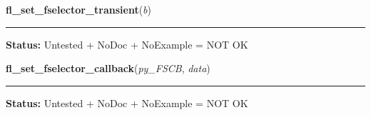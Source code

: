     \label{xformslib:library:fl_set_fselector_transient}

    \vspace{0.5ex}

\hspace{.8\funcindent}\begin{boxedminipage}{\funcwidth}

    \raggedright \textbf{fl\_set\_fselector\_transient}(\textit{b})

    \vspace{-1.5ex}

    \rule{\textwidth}{0.5\fboxrule}
\setlength{\parskip}{2ex}
\setlength{\parskip}{1ex}
\textbf{Status:} Untested + NoDoc + NoExample = NOT OK



    \end{boxedminipage}

    \label{xformslib:library:fl_set_fselector_callback}

    \vspace{0.5ex}

\hspace{.8\funcindent}\begin{boxedminipage}{\funcwidth}

    \raggedright \textbf{fl\_set\_fselector\_callback}(\textit{py\_FSCB}, \textit{data})

    \vspace{-1.5ex}

    \rule{\textwidth}{0.5\fboxrule}
\setlength{\parskip}{2ex}
\setlength{\parskip}{1ex}
\textbf{Status:} Untested + NoDoc + NoExample = NOT OK



    \end{boxedminipage}

    \label{xformslib:library:fl_get_filename}

    \vspace{0.5ex}

